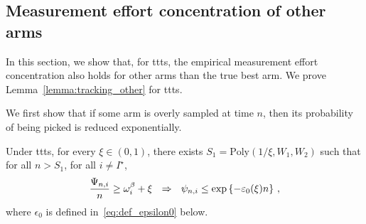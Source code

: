 \subsection{Measurement effort concentration of other arms}\label{app:confidence_ttts.other_arms}

In this section, we show that, for \gls{ttts}, the empirical measurement effort concentration also holds for other arms than the true best arm. We prove Lemma~\ref{lemma:tracking_other} for \gls{ttts}.

We first show that if some arm is overly sampled at time $n$, then its probability of being picked is reduced exponentially.

\begin{lemma}\label{lemma:over_allocation_finite_ttts} 
    Under \gls{ttts}, for every $\xi \in (0,1)$, there exists $S_1 = \text{Poly}(1/\xi,W_1,W_2)$ such that for all $n > S_1$, for all $i\neq I^\star$, 
    \[
        \frac{\Psi_{n,i}}{n} \geq \omega_{i}^\beta + \xi  \ \ \Rightarrow \ \ \psi_{n,i} \leq \exp\left\{-\varepsilon_0(\xi) n\right\}\,,
    \]
    where $\epsilon_0$ is defined in~\eqref{eq:def_epsilon0} below.
\end{lemma}


